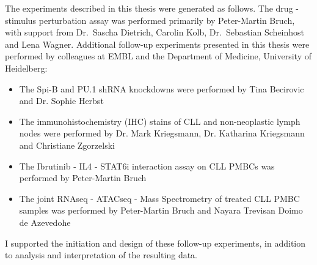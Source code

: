 \documentclass[11pt, a4paper, twosided]{book}
\begin{document}
    The experiments described in this thesis were generated as follows. The drug - stimulus perturbation assay was performed primarily by Peter-Martin Bruch, with support from Dr.~Sascha Dietrich, Carolin Kolb, Dr.~Sebastian Scheinhost and Lena Wagner. Additional follow-up experiments presented in this thesis were performed by colleagues at EMBL and the Department of Medicine, University of Heidelberg:
    \begin{itemize}
        \item  The Spi-B and PU.1 shRNA knockdowns were performed by Tina Becirovic and Dr. Sophie Herbst
        \item  The immunohistochemistry (IHC) stains of CLL and non-neoplastic lymph nodes were performed by Dr. Mark Kriegsmann, Dr. Katharina Kriegsmann and Christiane Zgorzelski
        \item  The Ibrutinib - IL4 - STAT6i interaction assay on CLL PMBCs was performed by Peter-Martin Bruch
        \item  The joint RNAseq - ATACseq - Mass Spectrometry of treated CLL PMBC samples was performed by Peter-Martin Bruch and Nayara Trevisan Doimo de Azevedohe
        
    \end{itemize}
    I supported the initiation and design of these follow-up experiments, in addition to analysis and interpretation of the resulting data.
\newpage\null\newpage
\end{document}
